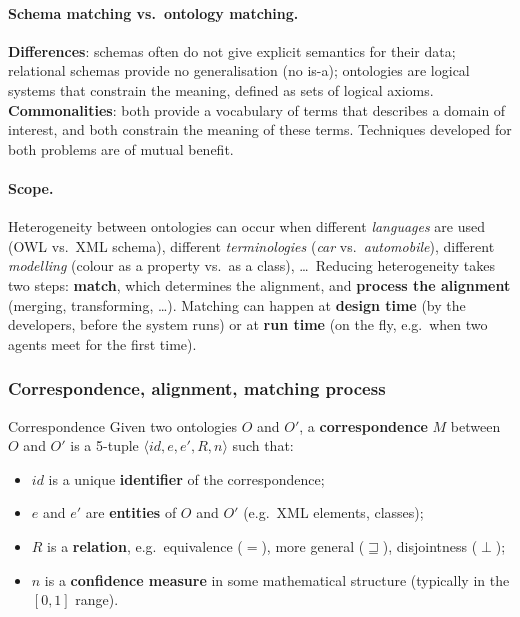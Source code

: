 \paragraph{Schema matching vs.\ ontology matching.}
\textbf{Differences}: schemas often do not give explicit semantics for their data;
relational schemas provide no generalisation (no is-a); ontologies are logical systems
that constrain the meaning, defined as sets of logical axioms. \textbf{Commonalities}:
both provide a vocabulary of terms that describes a domain of interest, and both
constrain the meaning of these terms. Techniques developed for both problems are of
mutual benefit.

\paragraph{Scope.}
Heterogeneity between ontologies can occur when different \emph{languages} are used
(OWL vs.\ XML schema), different \emph{terminologies} (\emph{car} vs.\
\emph{automobile}), different \emph{modelling} (colour as a property vs.\ as a class),
\ldots\ Reducing heterogeneity takes two steps: \textbf{match}, which determines the
alignment, and \textbf{process the alignment} (merging, transforming, \ldots). Matching
can happen at \textbf{design time} (by the developers, before the system runs) or at
\textbf{run time} (on the fly, e.g.\ when two agents meet for the first time).

\subsubsection{Correspondence, alignment, matching process}

\begin{nbdef}{Correspondence}
Given two ontologies $O$ and $O'$, a \textbf{correspondence} $M$ between $O$ and $O'$ is
a 5-tuple $\langle id, e, e', R, n\rangle$ such that:
\begin{itemize}[nosep]
  \item $id$ is a unique \textbf{identifier} of the correspondence;
  \item $e$ and $e'$ are \textbf{entities} of $O$ and $O'$ (e.g.\ XML elements, classes);
  \item $R$ is a \textbf{relation}, e.g.\ equivalence ($=$), more general
        ($\sqsupseteq$), disjointness ($\perp$);
  \item $n$ is a \textbf{confidence measure} in some mathematical structure (typically
        in the $[0,1]$ range).
\end{itemize}
\end{nbdef}

